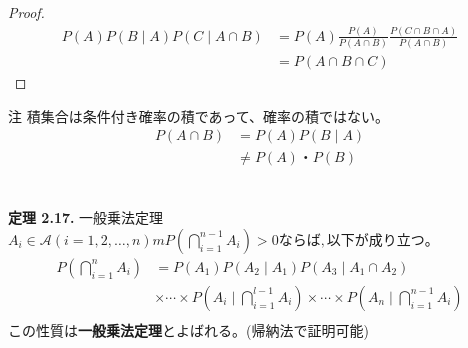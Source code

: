 \documentclass[dvipdfmx,10pt, a4j]{jarticle}
\theoremstyle{definition}
\begin{document}
    \begin{proof}
        \begin{align*}
            P(A)P(B \mid A)P(C \mid A \cap B) &= P(A) \frac{P(A)}{P(A \cap B)} \frac{P(C \cap B \cap A)}{P(A \cap B)}\\
            &= P(A \cap B \cap C)
        \end{align*}
    \end{proof}
    \begin{itembox}[l]{注}
        積集合は条件付き確率の積であって、確率の積ではない。\\
        \begin{align*}
            P(A \cap B) &= P(A)P(B \mid A)\\
            &\neq P(A)・P(B)\\
        \end{align*}
    \end{itembox}\\

    \noindent
    \textbf{定理 2.17.} 一般乗法定理\\
    $A_i \in \mathcal{A} (i = 1,2, \dots, n)m P\left(\bigcap_{i=1}^{n-1}{A_i}\right) > 0 ならば, 以下が成り立つ。$\\
    \begin{align*}
        P(\bigcap_{i=1}^{n}{A_i}) &= P(A_1)P(A_2 \mid A_1)P(A_3 \mid A_1 \cap A_2)\\
        & × \cdots × P(A_i \mid \bigcap_{i=1}^{l-1}{A_i}) × \cdots × P(A_n \mid \bigcap_{i=1}^{n-1}{A_i})\\
    \end{align*}
    この性質は\textbf{一般乗法定理}とよばれる。(帰納法で証明可能)\\
\end{document}
